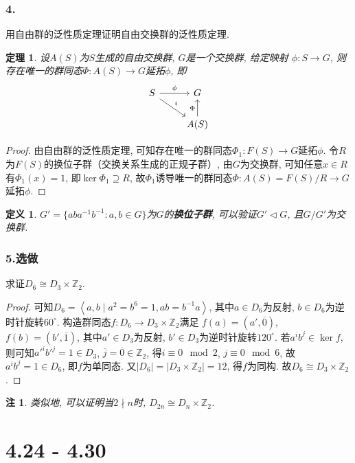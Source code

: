 \documentclass[12pt, a4paper, fontset=windows]{ctexart}
\newcommand{\Z}{\mathbb{Z}}
\newcommand{\abs}[1]{\left|{#1}\right|}
\newcommand{\cl}[1]{\overline{#1}} %
\newcommand{\gen}[1]{\left\langle{#1}\right\rangle}
\newcommand{\isom}{\cong} %
\newcommand{\kh}[1]{（{#1}）} %
\newcommand{\xuan}{{\normalsize 选做}}
\newtheorem*{definition}{定义}
\newtheorem*{remark}{注}
\newtheorem*{theorem}{定理}
\begin{document}
\section*{4.}

用自由群的泛性质定理证明自由交换群的泛性质定理. 

\begin{theorem}
设$A(S)$为$S$生成的自由交换群, $G$是一个交换群, 给定映射
$\phi:S\to G$, 则存在唯一的群同态$\Phi:A(S)\to G$延拓$\phi$, 即
\[\begin{tikzcd}
S\ar[r,"\phi"]\ar[rd,"i"]&G\\
&A(S)\ar[u,"\Phi"]
\end{tikzcd}\]
\end{theorem}

\begin{proof}
由自由群的泛性质定理, 可知存在唯一的群同态$\Phi_1:F(S)\to G$延拓$\phi$. 
令$R$为$F(S)$的换位子群\kh{交换关系生成的正规子群}, 由$G$为交换群, 可知任意$x\in R$有$\Phi_1(x)=1$, 
即$\ker\Phi_1\supseteq R$, 故$\Phi_1$诱导唯一的群同态$\Phi:A(S)=F(S)/R\to G$延拓$\phi$. 
\end{proof}

\begin{definition}
$G'=\{aba^{-1}b^{-1}:a,b\in G\}$为$G$的{\bf 换位子群}, 
可以验证$G'\lhd G$, 且$G/G'$为交换群. 
\end{definition}

\section*{5.\xuan}

求证$D_6\isom D_3\times\Z_2$. 

\begin{proof}
可知$D_6=\gen{a,b\mid a^2=b^6=1,ab=b^{-1}a}$, 其中$a\in D_6$为反射, 
$b\in D_6$为逆时针旋转$60^\circ$. 构造群同态$f:D_6\to D_3\times\Z_2$满足
$f(a)=(a',\cl{0})$, $f(b)=(b',\cl{1})$, 
其中$a'\in D_3$为反射, $b'\in D_3$为逆时针旋转$120^\circ$. 
若$a^ib^j\in\ker f$, 则可知$a'^ib'^j=1\in D_3$, 
$\cl{j}=\cl{0}\in\Z_2$, 得$i\equiv 0\mod 2$, $j\equiv 0\mod 6$, 
故$a^ib^j=1\in D_6$, 即$f$为单同态. 又$\abs{D_6}=\abs{D_3\times\Z_2}=12$, 
得$f$为同构. 故$D_6\isom D_3\times\Z_2$. 
\end{proof}

\begin{remark}
类似地, 可以证明当$2\nmid n$时, $D_{2n}\isom D_n\times\Z_2$. 
\end{remark}

\clearpage
\part{4.24 - 4.30}
\end{document}
